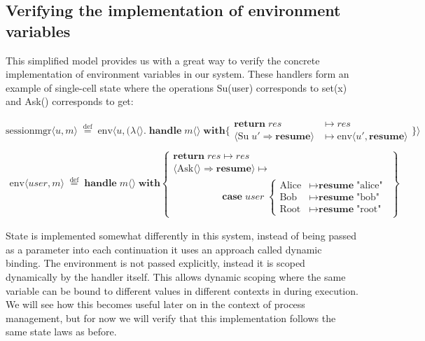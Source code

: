 \documentclass[logo,bsc,singlespacing,parskip]{infthesis}
\begin{document}
\subsection{Verifying the implementation of environment variables}
This simplified model provides us with a great way to verify the concrete implementation of environment variables in our system. These handlers form an example of single-cell state where the operations Su(user) corresponds to set(x) and Ask() corresponds to get:

\[
 \text{sessionmgr} \langle \mathit{u}, m \rangle \;\overset{\mathrm{def}}{=} \;
 \text{env} \langle \mathit{u}, (\lambda \langle \rangle.\; \textbf{handle}\; m \langle \rangle\; \textbf{with}  \{ 
 \begin{array}{ll}
   \textbf{return}\; res & \mapsto res \\
   \!\langle \text{Su}\; \mathit{u'} \Rightarrow \textbf{resume} \!\rangle & \mapsto \text{env} \langle \mathit{u'}, \textbf{resume} \rangle
 \end{array}
 \} \rangle 
 \]
\[
\begin{array}{l}
\\
\text{env} \langle \mathit{user}, m \rangle \;\overset{\mathrm{def}}{=} \;
\textbf{handle}\; m \langle \rangle\; \textbf{with} \left\{
\begin{array}{ll}
\textbf{return}\; res  \mapsto res \\
\langle \text{Ask} \langle \rangle \Rightarrow \textbf{resume} \rangle  \mapsto \\
\quad\quad\quad\quad\quad\textbf{case}\; \mathit{user}\; \left\{
\begin{array}{ll}
\text{Alice} & \mapsto \textbf{resume}\; \text{"alice"} \\
\text{Bob} & \mapsto \textbf{resume}\; \text{"bob"} \\
\text{Root} & \mapsto \textbf{resume}\; \text{"root"}
\end{array}
\right.
\end{array}
\right\}
\end{array}
\]

State is implemented somewhat differently in this system, instead of being passed as a parameter into each continuation it uses an approach called dynamic binding. The environment is not passed explicitly, instead it is scoped dynamically by the handler itself. This allows dynamic scoping where the same variable can be bound to different values in different contexts in during execution. We will see how this becomes useful later on in the context of process management, but for now we will verify that this implementation follows the same state laws as before.
\end{document}
